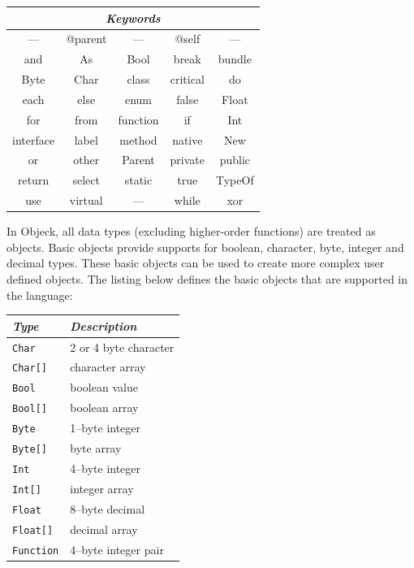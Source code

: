 \documentclass[11pt]{article}
\begin{document}
\begin{center}
  \begin{tabular}{ | c | c | c | c | c | }
    \hline
    \multicolumn{5}{|c|}{\emph{Keywords}} \\ \hline \hline
    --- & @parent & --- & @self & --- \\ \hline
    and & As & Bool & break & bundle \\ \hline
    Byte & Char & class & critical & do \\ \hline
    each & else & enum & false & Float \\ \hline
    for & from & function & if & Int \\ \hline
    interface & label & method & native & New \\ \hline
    or & other & Parent & private & public \\ \hline
    return & select & static & true & TypeOf \\ \hline
    use & virtual & --- & while & xor \\ \hline
  \end{tabular}
\end{center}

In Objeck, all data types (excluding higher-order functions) are
treated as objects. Basic objects provide supports for boolean,
character, byte, integer and decimal types.  These basic objects can
be used to create more complex user defined objects.  The listing
below defines the basic objects that are supported in the language:

\begin{center}
  \begin{tabular}{| l | l |}
    \hline
    \emph{Type} & \emph{Description} \\ \hline \hline
    \texttt{Char} & 2 or 4 byte character \\ \hline
    \texttt{Char[]} &  character array \\ \hline
    \texttt{Bool} &  boolean value \\ \hline
    \texttt{Bool[]} &  boolean array \\ \hline
    \texttt{Byte} &  1--byte integer \\ \hline
    \texttt{Byte[]} &  byte array \\ \hline
    \texttt{Int} &  4--byte integer \\ \hline
    \texttt{Int[]} &  integer array \\ \hline
    \texttt{Float} &  8--byte decimal \\ \hline
    \texttt{Float[]} &  decimal array \\ \hline
    \texttt{Function} &  4--byte integer pair \\ \hline
  \end{tabular}
\end{center}
\end{document}
